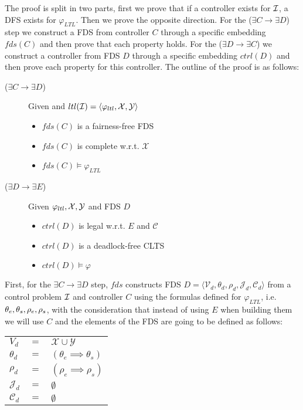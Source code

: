 The proof is split in two parts, first we prove that if a controller exists for ${\mathcal{I}}$, a DFS exists for $\varphi_{LTL}$. Then we prove the opposite direction. For the ($\exists C \rightarrow \exists D$) step we construct a FDS from controller $C$ through a specific embedding $fds(C)$ and then prove that each property holds. For the ($\exists D \rightarrow \exists C$) we construct a controller from FDS $D$ through a specific embedding $ctrl(D)$ and then prove each property for this controller. The outline of the proof is as follows:

\begin{description}
	\item[($\exists C \rightarrow \exists D$)] Given \controlProblemDef and $ltl({\mathcal{I}}) = \langle \varphi_{ltl}, {\mathcal{X}}, {\mathcal{Y}}\rangle$
		\begin{itemize}
			\item $fds(C)$ is a fairness-free FDS			
			\item $fds(C)$ is complete w.r.t. $\mathcal{X}$
			\item $fds(C) \models \varphi_{LTL}$
		\end{itemize}
	\item[($\exists D \rightarrow \exists E$)] Given $\varphi_{ltl}, {\mathcal{X}}, {\mathcal{Y}}$ and FDS $D$
		\begin{itemize}
			\item $ctrl(D)$ is legal w.r.t. $E$ and $\mathcal{C}$
			\item $ctrl(D)$ is a deadlock-free CLTS			
			\item $ctrl(D) \models \varphi$
		\end{itemize}	
\end{description}

First,  for the $\exists C \rightarrow \exists D$ step, $fds$ constructs FDS $D=\langle \mathcal V_d, \theta_d, \rho_d, \mathcal{J}_d, \mathcal{C}_d \rangle$ from a control problem ${\mathcal{I}}$ and controller $C$ using the formulas defined for $\varphi_{LTL}$, i.e. ${\theta_e}, {\theta_s}, {\rho_e}, {\rho_s}$, with the consideration that instead of using $E$ when building them we will use $C$ and the elements of the FDS are going to be defined as follows:

\begin{tabular}{ l c l }
	$V_d$ & $=$ & $\mathcal{X} \cup \mathcal{Y}$\\	
	$\theta_d$ & $=$ & $(\theta_e \implies \theta_s)$\\
	$\rho_d$ & $=$ & $(\rho_e \implies \rho_s)$\\	
	$\mathcal{J}_d$ & $=$ & $\emptyset$\\
	$\mathcal{C}_d$ & $=$ & $\emptyset$\\
\end{tabular}

